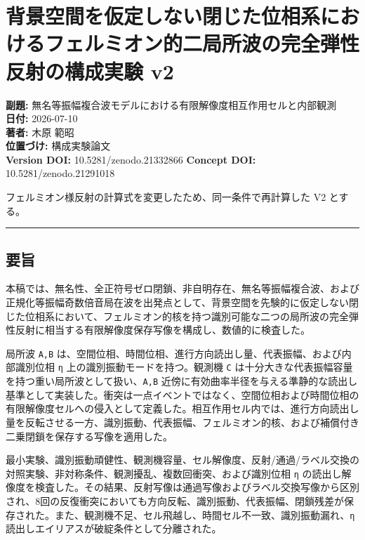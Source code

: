 \documentclass[
  a4paper,
]{article}
\author{}
\date{}
\begin{document}
\section{背景空間を仮定しない閉じた位相系におけるフェルミオン的二局所波の完全弾性反射の構成実験
v2}\label{ux80ccux666fux7a7aux9593ux3092ux4eeeux5b9aux3057ux306aux3044ux9589ux3058ux305fux4f4dux76f8ux7cfbux306bux304aux3051ux308bux30d5ux30a7ux30ebux30dfux30aaux30f3ux7684ux4e8cux5c40ux6240ux6ce2ux306eux5b8cux5168ux5f3eux6027ux53cdux5c04ux306eux69cbux6210ux5b9fux9a13-v2}

\textbf{副題:}
無名等振幅複合波モデルにおける有限解像度相互作用セルと内部観測\\
\textbf{日付:} 2026-07-10\\
\textbf{著者:} 木原 範昭\\
\textbf{位置づけ:} 構成実験論文\\
\textbf{Version DOI:} 10.5281/zenodo.21332866 \textbf{Concept DOI:}
10.5281/zenodo.21291018

フェルミオン様反射の計算式を変更したため、同一条件で再計算した V2
とする。

\begin{center}\rule{0.5\linewidth}{0.5pt}\end{center}

\subsection{要旨}\label{ux8981ux65e8}

本稿では、無名性、全正符号ゼロ閉鎖、非自明存在、無名等振幅複合波、および正規化等振幅奇数倍音局在波を出発点として、背景空間を先験的に仮定しない閉じた位相系において、フェルミオン的核を持つ識別可能な二つの局所波の完全弾性反射に相当する有限解像度保存写像を構成し、数値的に検査した。

局所波 \texttt{A,B}
は、空間位相、時間位相、進行方向読出し量、代表振幅、および内部識別位相
\texttt{η} 上の識別振動モードを持つ。観測機 \texttt{C}
は十分大きな代表振幅容量を持つ重い局所波として扱い、\texttt{A,B}
近傍に有効曲率半径を与える準静的な読出し基準として実装した。衝突は一点イベントではなく、空間位相および時間位相の有限解像度セルへの侵入として定義した。相互作用セル内では、進行方向読出し量を反転させる一方、識別振動、代表振幅、フェルミオン的核、および補償付き二乗閉鎖を保存する写像を適用した。

最小実験、識別振動頑健性、観測機容量、セル解像度、反射/通過/ラベル交換の対照実験、非対称条件、観測擾乱、複数回衝突、および識別位相
\texttt{η}
の読出し解像度を検査した。その結果、反射写像は通過写像およびラベル交換写像から区別され、8回の反復衝突においても方向反転、識別振動、代表振幅、閉鎖残差が保存された。また、観測機不足、セル飛越し、時間セル不一致、識別振動漏れ、\texttt{η}
読出しエイリアスが破綻条件として分離された。
\end{document}
